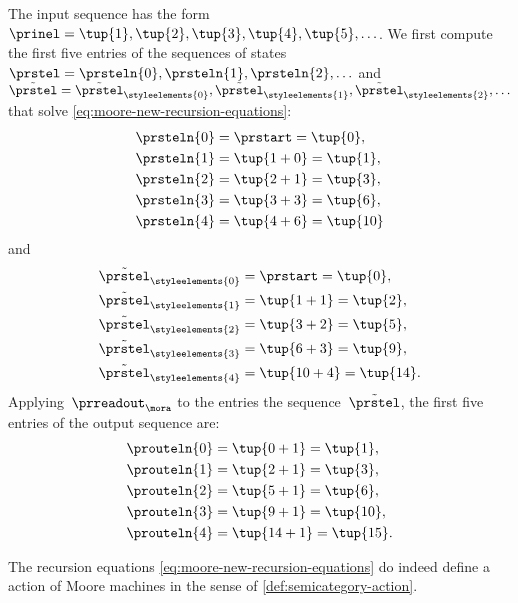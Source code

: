 \begin{example}
    The input sequence has the form~$\prinel = \tup{1}, \tup{2}, \tup{3}, \tup{4}, \tup{5}, \ldots$.
    We first compute the first five entries of the sequences of states~$\prstel = \prsteln{0}, \prsteln{1}, \prsteln{2}, \ldots$ and~$\tilde{\prstel} = \tilde{\prstel}_\styleelements{0}, \tilde{\prstel}_\styleelements{1}, \tilde{\prstel}_\styleelements{2}, \ldots$ that solve \cref{eq:moore-new-recursion-equations}:
    \begin{align}
        \prsteln{0} & = \prstart = \tup{0}, \\
        \prsteln{1} & = \tup{1 + 0} = \tup{1}, \\
        \prsteln{2} & = \tup{2 + 1} = \tup{3}, \\
        \prsteln{3} & = \tup{3 + 3} = \tup{6}, \\
        \prsteln{4} & = \tup{4 + 6} = \tup{10}
    \end{align}
    and
    \begin{align}
        \tilde{\prstel}_\styleelements{0} & = \prstart = \tup{0}, \\
        \tilde{\prstel}_\styleelements{1} & = \tup{1 + 1} = \tup{2}, \\
        \tilde{\prstel}_\styleelements{2} & = \tup{3 + 2} = \tup{5}, \\
        \tilde{\prstel}_\styleelements{3} & = \tup{6 + 3} = \tup{9}, \\
        \tilde{\prstel}_\styleelements{4} & = \tup{10 + 4} = \tup{14}.
    \end{align}
    Applying~$\prreadout_\mora$ to the entries the sequence~$\tilde \prstel$, the first five entries of the output sequence are:
    \begin{align}
        \prouteln{0} & = \tup{0 + 1} = \tup{1}, \\
        \prouteln{1} & = \tup{2 + 1} = \tup{3}, \\
        \prouteln{2} & = \tup{5 + 1} = \tup{6}, \\
        \prouteln{3} & = \tup{9 + 1} = \tup{10}, \\
        \prouteln{4} & = \tup{14 + 1} = \tup{15}.
    \end{align}
\end{example}


\begin{lemma}\label{lem:moore-new-recursion-equations}
    The recursion equations \cref{eq:moore-new-recursion-equations} do indeed define a  action of Moore machines in the sense of \cref{def:semicategory-action}.
\end{lemma}

